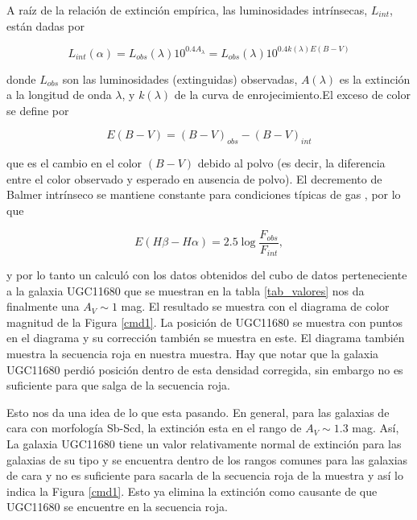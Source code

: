 \noindent A raíz de la relación de extinción empírica, las luminosidades intrínsecas, $L _{int}$, están dadas por

\begin{equation}
L _{int} (\alpha) = L_{obs} (\lambda) 10^{0.4A_{\lambda}} =L_{obs} (\lambda) 10^{0.4k(\lambda)E(B-V)}
\end{equation}

\noindent donde $L_{obs}$ son las luminosidades (extinguidas) observadas, $A(\lambda)$ es la extinción a la longitud de onda $\lambda$,
 y $k(\lambda)$ de la curva de enrojecimiento.El exceso de color se define por

\begin{equation}
E(B -V) =(B - V)_{obs}-(B - V)_{int}
\end{equation}

\noindent que es el cambio en el  color $(B - V)$  debido al polvo (es decir, la diferencia entre el color observado y esperado
en ausencia de polvo). El decremento de Balmer intrínseco se mantiene constante para condiciones típicas de gas \citep{osterbrock1989}, por lo que


\begin{equation}
E(H\beta - H\alpha) = 2.5 \log \frac{F_{obs}}{F_{int}},
\end{equation}





\noindent y por lo tanto un calculó con los datos obtenidos del cubo de datos perteneciente a la galaxia UGC11680 que se muestran en
la tabla \ref{tab_valores} nos da finalmente una  $A_V \sim 1$ mag. El resultado se muestra con el diagrama de color magnitud de la Figura \ref{cmd1}. La posición de UGC11680 se muestra con puntos en el diagrama y su corrección también se muestra en este. El diagrama también muestra la secuencia roja  en nuestra muestra. Hay que notar que la galaxia UGC11680 perdió posición dentro de esta densidad corregida, sin embargo no es suficiente para que salga de la secuencia roja.


\bigskip


\noindent Esto nos da una idea de lo que esta pasando. En general, \citep{sanchez2012} para las galaxias de cara con morfología Sb-Scd, la extinción esta en el rango de $A_V \sim 1.3$ mag. Así, La galaxia UGC11680 tiene un valor relativamente normal de extinción para las galaxias de su tipo y se encuentra dentro de los rangos comunes para las galaxias de cara y no es suficiente para sacarla de la secuencia roja de la muestra y así lo indica la Figura \ref{cmd1}. Esto ya elimina la extinción como causante de que UGC11680 se encuentre en la secuencia roja.





